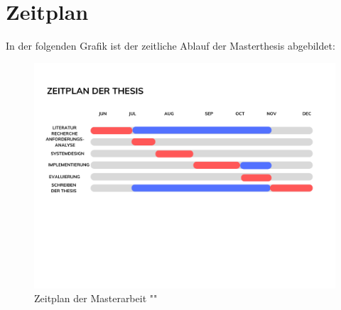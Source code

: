 \chapter{Zeitplan}
\label{cha:grundlagen}


In der folgenden Grafik ist der zeitliche Ablauf der Masterthesis abgebildet:
\begin{figure}[htb]
	\centering
	\includegraphics[width=1\textwidth,angle=0]{media/zeitplan}
	\caption{Zeitplan der Masterarbeit ""}
	\label{fig:beispiel}
\end{figure}